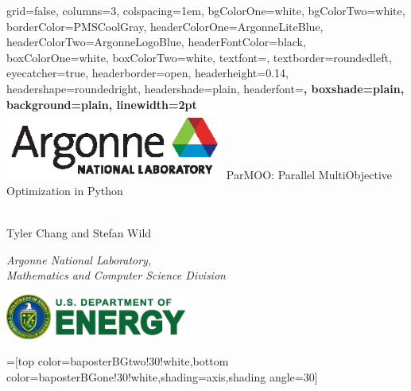 \documentclass[a0paper,landscape]{baposter}
\begin{document}
\begin{poster}{
  grid=false,
  columns=3,
  colspacing=1em,
  bgColorOne=white,
  bgColorTwo=white,
  borderColor=PMSCoolGray,
  headerColorOne=ArgonneLiteBlue,
  headerColorTwo=ArgonneLogoBlue,
  headerFontColor=black,
  boxColorOne=white,
  boxColorTwo=white,
  textfont=\large,
  textborder=roundedleft,
  eyecatcher=true,
  headerborder=open,
  headerheight=0.14\textheight,
  headershape=roundedright,
  headershade=plain,
  headerfont=\Large\sf\bf, %
  boxshade=plain,
  background=plain,
  linewidth=2pt
  }
  {\includegraphics[height=6em]{Argonne_cmyk_black.eps}} %
  {\sf ParMOO: Parallel MultiObjective Optimization in Python\\$\quad$}
  {\sf  \phantom{\hspace{0em}}
    Tyler Chang and Stefan Wild\\

    \smallskip

    {\it \small
    Argonne National Laboratory,\\
    Mathematics and Computer Science Division
    \par
    }

  }
  {
    \includegraphics[height=4em]{DOE_logo_color_cmyk}
  }

  =[top color=baposterBGtwo!30!white,bottom color=baposterBGone!30!white,shading=axis,shading angle=30]

 \newlength{\leftimgwidth}
 \setlength{\leftimgwidth}{0.78em+8.0em}
 
 \newcommand{\thebox}{\stepcounter{boxnum} \arabic{boxnum}. }


\end{poster}
\end{document}
